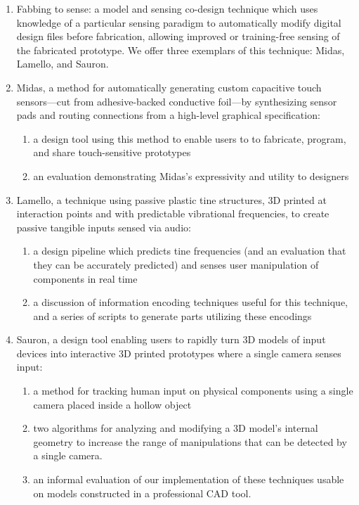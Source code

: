 \begin{enumerate}
\item Fabbing to sense: a model and sensing co-design technique which uses knowledge of a particular sensing paradigm to automatically modify digital design files before fabrication, allowing improved or training-free sensing of the fabricated prototype. We offer three exemplars of this technique: Midas, Lamello, and Sauron.
\item Midas, a method for automatically generating custom capacitive touch sensors---cut from adhesive-backed conductive foil---by synthesizing sensor pads and routing connections from a high-level graphical specification:
\begin{enumerate}
    \item a design tool using this method to enable users to to fabricate, program, and share touch-sensitive prototypes
    \item an evaluation demonstrating Midas’s expressivity and utility to designers
    \end{enumerate}
\item Lamello, a technique using passive plastic tine structures, 3D printed at interaction points and with predictable vibrational frequencies, to create passive tangible inputs sensed via audio:
\begin{enumerate}
    \item a design pipeline which predicts tine frequencies (and an evaluation that they can be accurately predicted) and senses user manipulation of components in real time
    \item a discussion of information encoding techniques useful for this technique, and a series of scripts to generate parts utilizing these encodings
    \end{enumerate}
\item Sauron, a design tool enabling users to rapidly turn 3D models of input devices into interactive 3D printed prototypes where a single camera senses input: %
\begin{enumerate}
    \item a method for tracking human input on physical components using a single camera placed inside a hollow object
    \item two algorithms for analyzing and modifying a 3D model’s internal geometry to increase the range of manipulations that can be detected by a single camera.
    \item an informal evaluation of our implementation of these techniques usable on models constructed in a professional CAD tool.
    \end{enumerate}
\end{enumerate}